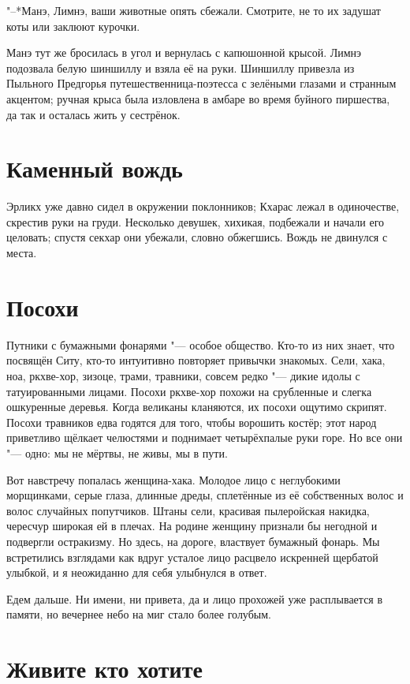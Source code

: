 \documentclass[a4paper,10pt]{book}
\newcommand{\ldotst}{\so{...}\xspace}
\begin{document}
 "--*Манэ, Лимнэ, ваши животные опять сбежали. Смотрите, не то их задушат коты или заклюют курочки.
 
 Манэ тут же бросилась в угол и вернулась с капюшонной крысой. Лимнэ подозвала белую шиншиллу и взяла её на руки.
 Шиншиллу привезла из Пыльного Предгорья путешественница-поэтесса с зелёными глазами и странным акцентом; ручная крыса была изловлена в амбаре во время буйного пиршества, да так и осталась жить у сестрёнок.
 
 \section{Каменный вождь}

 Эрликх уже давно сидел в окружении поклонников; Кхарас лежал в одиночестве, скрестив руки на груди. Несколько девушек, хихикая, подбежали и начали его целовать; спустя секхар они убежали, словно обжегшись. Вождь не двинулся с места.
 
 \section{Посохи}

 
 Путники с бумажными фонарями "--- особое общество. Кто-то из них знает, что посвящён Ситу, кто-то интуитивно повторяет привычки знакомых. Сели, хака, ноа, ркхве-хор, зизоце, трами, травники, совсем редко "--- дикие идолы с татуированными лицами. Посохи ркхве-хор похожи на срубленные и слегка ошкуренные деревья. Когда великаны кланяются, их посохи ощутимо скрипят. Посохи травников едва годятся для того, чтобы ворошить костёр; этот народ приветливо щёлкает челюстями и поднимает четырёхпалые руки горе. Но все они "--- одно: мы не мёртвы, не живы, мы в пути.

Вот навстречу попалась женщина-хака. Молодое лицо с неглубокими морщинками, серые глаза, длинные дреды, сплетённые из её собственных волос и волос случайных попутчиков. Штаны сели, красивая пылеройская накидка, чересчур широкая ей в плечах. На родине женщину признали бы негодной и подвергли остракизму. Но здесь, на дороге, властвует бумажный фонарь. Мы встретились взглядами\ldotst как вдруг усталое лицо расцвело искренней щербатой улыбкой, и я неожиданно для себя улыбнулся в ответ.

Едем дальше. Ни имени, ни привета, да и лицо прохожей уже расплывается в памяти, но вечернее небо на миг стало более голубым.
 
\section{Живите кто хотите}
\end{document}
